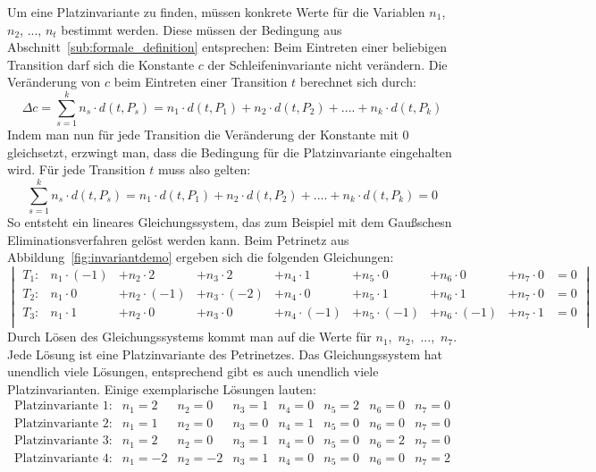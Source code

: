 		Um eine Platzinvariante zu finden, müssen konkrete Werte für die Variablen $n_1$, $n_2$, ..., $n_t$ bestimmt werden. Diese müssen der Bedingung aus Abschnitt~\ref{sub:formale_definition} entsprechen: Beim Eintreten einer beliebigen Transition darf sich die Konstante $c$ der Schleifeninvariante nicht verändern. Die Veränderung von $c$ beim Eintreten einer Transition $t$ berechnet sich durch:
		$$
		\Delta c = \sum_{s=1}^k n_s \cdot d(t, P_s) = n_1 \cdot d(t, P_1) + n_2 \cdot d(t, P_2) + .... + n_k \cdot d(t, P_k)
		$$
		Indem man nun für jede Transition die Veränderung der Konstante mit $0$ gleichsetzt, erzwingt man, dass die Bedingung für die Platzinvariante eingehalten wird. Für jede Transition $t$ muss also gelten: 
		$$
		\sum_{s=1}^k n_s \cdot d(t, P_s) = n_1 \cdot d(t, P_1) + n_2 \cdot d(t, P_2) + .... + n_k \cdot d(t, P_k) = 0
		$$
		So entsteht ein lineares Gleichungssystem, das zum Beispiel mit dem Gaußschesn Eliminationsverfahren gelöst werden kann. Beim Petrinetz aus Abbildung~\ref{fig:invariantdemo} ergeben sich die folgenden Gleichungen:
		$$
		\begin{vmatrix}
			T_1: & n_1 \cdot (-1) &+ n_2 \cdot 2 &+ n_3 \cdot 2 &+ n_4 \cdot 1 &+ n_5 \cdot 0 &+ n_6 \cdot 0 &+ n_7 \cdot 0 & = 0 \\
			T_2: & n_1 \cdot 0 &+ n_2 \cdot (-1) &+ n_3 \cdot (-2) &+ n_4 \cdot 0 &+ n_5 \cdot 1 &+ n_6 \cdot 1 &+ n_7 \cdot 0 & = 0 \\
			T_3: & n_1 \cdot 1 &+ n_2 \cdot 0 &+ n_3 \cdot 0 &+ n_4 \cdot (-1) &+ n_5 \cdot (-1) &+ n_6 \cdot (-1) &+ n_7 \cdot 1 & = 0 \\
		\end{vmatrix}
		$$
		Durch Lösen des Gleichungssystems kommt man auf die Werte für $n_1$,~$n_2$,~...,~$n_7$. Jede Lösung ist eine Platzinvariante des Petrinetzes. Das Gleichungssystem hat unendlich viele Lösungen, entsprechend gibt es auch unendlich viele Platzinvarianten. Einige exemplarische Lösungen lauten:
		$$
		\begin{matrix}
			\text{Platzinvariante 1}: & n_1 = 2 	& n_2 = 0 	& n_3 = 1 	& n_4 = 0 	& n_5 = 2 	& n_6 = 0 	& n_7 = 0 \\
			\text{Platzinvariante 2}: & n_1 = 1 	& n_2 = 0 	& n_3 = 0 	& n_4 = 1 	& n_5 = 0 	& n_6 = 0 	& n_7 = 0 \\
			\text{Platzinvariante 3}: & n_1 = 2 	& n_2 = 0 	& n_3 = 1 	& n_4 = 0 	& n_5 = 0 	& n_6 = 2 	& n_7 = 0 \\
			\text{Platzinvariante 4}: & n_1 = -2	& n_2 = -2 	& n_3 = 1 	& n_4 = 0 	& n_5 = 0 	& n_6 = 0 	& n_7 = 2 \\
		\end{matrix}
		$$
